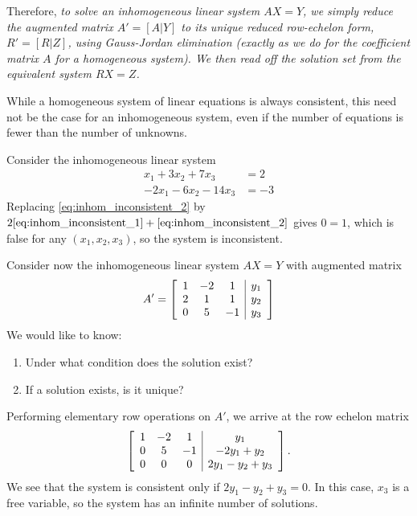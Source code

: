 \documentclass[12pt,letterpaper,reqno]{article}
\numberwithin{equation}{section}
\newcommand{\ti}[1]{\textit{#1}}
\begin{document}
Therefore, \ti{to solve an inhomogeneous linear system $AX=Y$, we simply reduce the augmented matrix $A'=[A|Y]$ to its unique reduced row-echelon form, $R'=[R|Z]$, using Gauss-Jordan elimination (exactly as we do for the coefficient matrix $A$ for a homogeneous system). We then read off the solution set from the equivalent system $RX=Z$.}

While a homogeneous system of linear equations is always consistent, this need not be the case for an inhomogeneous system, even if the number of equations is fewer than the number of unknowns.

\begin{example}
Consider the inhomogeneous linear system
	\begin{align}
		x_1+3x_2+7x_3&=2 \label{eq:inhom_inconsistent_1} \\
		-2x_1-6x_2-14x_3&=-3 \label{eq:inhom_inconsistent_2}
	\end{align}
Replacing \eqref{eq:inhom_inconsistent_2} by $2\eqref{eq:inhom_inconsistent_1}+\eqref{eq:inhom_inconsistent_2}$ gives $0=1$, which is false for any $(x_1,x_2,x_3)$, so the system is inconsistent.
\end{example}

\begin{example}
Consider now the inhomogeneous linear system $AX=Y$ with augmented matrix
\begin{equation}\label{eq:inhom_general_example}
A'=\left[\begin{array}{c c c | c}
		1&-2&1&y_1 \\
			2&1&1&y_2 \\
			0&5&-1&y_3
	\end{array}\right]
\end{equation}
We would like to know:
\begin{enumerate}
	\item Under what condition does the solution exist?
	\item If a solution exists, is it unique?
\end{enumerate}
Performing elementary row operations on $A'$, we arrive at the row echelon matrix
\begin{equation}
	\left[\begin{array}{c c c | c}
		1&-2&1&y_1 \\
			0&5&-1&-2y_1+y_2 \\
			0&0&0&2y_1-y_2+y_3
	\end{array}\right].
\end{equation}
We see that the system is consistent only if $2y_1-y_2+y_3=0$. In this case, $x_3$ is a free variable, so the system has an infinite number of solutions.
\end{example}
\end{document}
